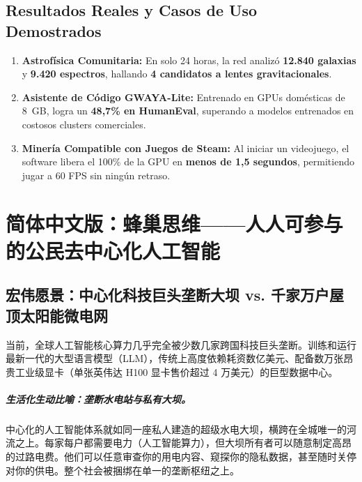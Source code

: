 \documentclass[11pt,a4paper]{report}
\begin{document}
\section{Resultados Reales y Casos de Uso Demostrados}
\begin{enumerate}[leftmargin=1.8em]
    \item \textbf{Astrofísica Comunitaria:} En solo 24 horas, la red analizó \textbf{12.840 galaxias} y \textbf{9.420 espectros}, hallando \textbf{4 candidatos a lentes gravitacionales}.
    \item \textbf{Asistente de Código GWAYA-Lite:} Entrenado en GPUs domésticas de 8~GB, logra un \textbf{48,7\% en HumanEval}, superando a modelos entrenados en costosos clusters comerciales.
    \item \textbf{Minería Compatible con Juegos de Steam:} Al iniciar un videojuego, el software libera el 100\% de la GPU en \textbf{menos de 1,5 segundos}, permitiendo jugar a 60 FPS sin ningún retraso.
\end{enumerate}

\newpage

\chapter{简体中文版：蜂巢思维——人人可参与的公民去中心化人工智能}
\label{chap:zh}

\section{宏伟愿景：中心化科技巨头垄断大坝 vs. 千家万户屋顶太阳能微电网}

当前，全球人工智能核心算力几乎完全被少数几家跨国科技巨头垄断。训练和运行最新一代的大型语言模型（LLM），传统上高度依赖耗资数亿美元、配备数万张昂贵工业级显卡（单张英伟达 H100 显卡售价超过 4 万美元）的巨型数据中心。

\paragraph{生活化生动比喻：垄断水电站与私有大坝。}
中心化的人工智能体系就如同一座私人建造的超级水电大坝，横跨在全城唯一的河流之上。每家每户都需要电力（人工智能算力），但大坝所有者可以随意制定高昂的过路电费。他们可以任意审查你的用电内容、窥探你的隐私数据，甚至随时关停对你的供电。整个社会被捆绑在单一的垄断枢纽之上。
\end{document}
